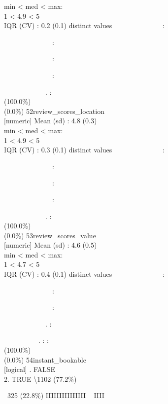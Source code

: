 \documentclass[
  journal,
]{IEEEtran}%
\begin{document}
min \textless{} med \textless{} max:\\
1 \textless{} 4.9 \textless{} 5\\
IQR (CV) : 0.2 (0.1)  distinct values \textbar{}
\textbar~~~~~~~~~~~~~~:\\
\strut ~~~~~~~~~~~~~~:\\
\strut ~~~~~~~~~~~~~~:\\
\strut ~~~~~~~~~~~~~~:\\
\strut ~~~~~~~~~~~~. : \\
(100.0\%) \\
(0.0\%) \textbar{} \textbar{} 52\textbar review\_scores\_location\\
{[}numeric{]} \textbar Mean (sd) : 4.8 (0.3)\\
min \textless{} med \textless{} max:\\
1 \textless{} 4.9 \textless{} 5\\
IQR (CV) : 0.3 (0.1)  distinct values \textbar{}
\textbar~~~~~~~~~~~~~~:\\
\strut ~~~~~~~~~~~~~~:\\
\strut ~~~~~~~~~~~~~~:\\
\strut ~~~~~~~~~~~~~~:\\
\strut ~~~~~~~~~~~~. : \\
(100.0\%) \\
(0.0\%) \textbar{} \textbar{} 53\textbar review\_scores\_value\\
{[}numeric{]} \textbar Mean (sd) : 4.6 (0.5)\\
min \textless{} med \textless{} max:\\
1 \textless{} 4.7 \textless{} 5\\
IQR (CV) : 0.4 (0.1)  distinct values \textbar{}
\textbar~~~~~~~~~~~~~~:\\
\strut ~~~~~~~~~~~~~~:\\
\strut ~~~~~~~~~~~~~~:\\
\strut ~~~~~~~~~~~~. :\\
\strut ~~~~~~~~~~. : : \\
(100.0\%) \\
(0.0\%) \textbar{} \textbar{} 54\textbar instant\_bookable\\
{[}logical{]} . FALSE\\
2. TRUE \textbar\textbackslash1102 (77.2\%)\\
\strut ~325 (22.8\%) \textbar{} \textbar IIIIIIIIIIIIIII ~ IIII
\\
\end{document}
